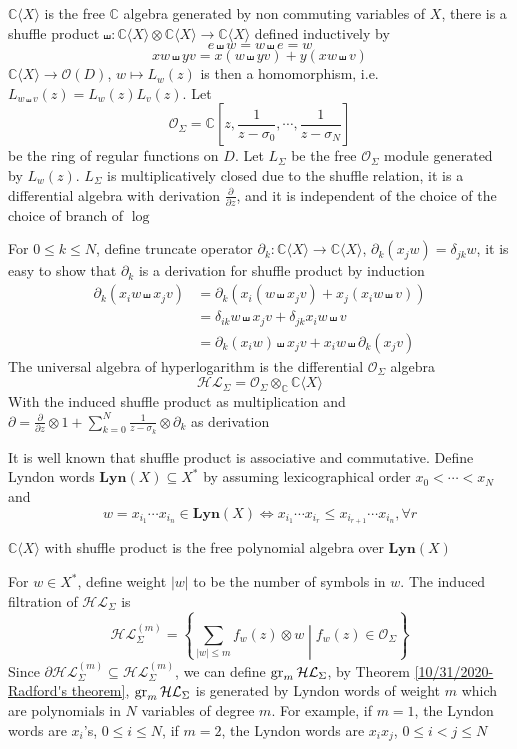 \documentclass[main]{subfiles}
\begin{document}
$\mathbb C\langle X\rangle$ is the free $\mathbb C$ algebra generated by non commuting variables of $X$, there is a shuffle product $\shuffle:\mathbb C\langle X\rangle\otimes\mathbb C\langle X\rangle\to\mathbb C\langle X\rangle$ defined inductively by
\[e\shuffle w=w\shuffle e=w\]
\[xw\shuffle yv=x(w\shuffle yv)+y(xw\shuffle v)\]
$\mathbb C\langle X\rangle\to\mathcal O(D)$, $w\mapsto L_w(z)$ is then a homomorphism, i.e. $L_{w\shuffle v}(z)=L_w(z)L_v(z)$. Let
\[\mathcal O_\Sigma=\mathbb C\left[z,\frac{1}{z-\sigma_0},\cdots,\frac{1}{z-\sigma_N}\right]\]
be the ring of regular functions on $D$. Let $L_\Sigma$ be the free $\mathcal O_\Sigma$ module generated by $L_w(z)$. $L_\Sigma$ is multiplicatively closed due to the shuffle relation, it is a differential algebra with derivation $\frac{\partial}{\partial z}$, and it is independent of the choice of the choice of branch of $\log$

For $0\leq k\leq N$, define truncate operator $\partial_k:\mathbb C\langle X\rangle\to\mathbb C\langle X\rangle$, $\partial_k(x_jw)=\delta_{jk}w$, it is easy to show that $\partial_k$ is a derivation for shuffle product by induction
\begin{align*}
\partial_k(x_iw\shuffle x_jv)&=\partial_k(x_i(w\shuffle x_jv)+x_j(x_iw\shuffle v)) \\
&=\delta_{ik}w\shuffle x_jv+\delta_{jk}x_iw\shuffle v \\
&=\partial_k(x_iw)\shuffle x_jv+x_iw\shuffle\partial_k(x_jv)
\end{align*}
The universal algebra of hyperlogarithm is the differential $\mathcal O_\Sigma$ algebra
\[\mathcal{HL}_\Sigma=\mathcal O_\Sigma\otimes_{\mathbb C}\mathbb C\langle X\rangle\]
With the induced shuffle product as multiplication and $\partial=\frac{\partial}{\partial z}\otimes1+\sum_{k=0}^N\frac{1}{z-\sigma_k}\otimes\partial_k$ as derivation

It is well known that shuffle product is associative and commutative. Define Lyndon words $\mathbf{Lyn}(X)\subseteq X^*$ by assuming lexicographical order $x_0<\cdots<x_N$ and
\[w=x_{i_1}\cdots x_{i_n}\in\mathbf{Lyn}(X)\iff x_{i_1}\cdots x_{i_r}\leq x_{i_{r+1}}\cdots x_{i_n},\forall r\]

\begin{theorem}[Radford]\label{10/31/2020-Radford's theorem}
$\mathbb C\langle X\rangle$ with shuffle product is the free polynomial algebra over $\mathbf{Lyn}(X)$
\end{theorem}

For $w\in X^*$, define weight $|w|$ to be the number of symbols in $w$. The induced filtration of $\mathcal{HL}_\Sigma$ is
\[\mathcal{HL}_\Sigma^{(m)}=\left\{\sum_{|w|\leq m}f_w(z)\otimes w\middle|f_w(z)\in\mathcal O_\Sigma\right\}\]
Since $\partial\mathcal{HL}_\Sigma^{(m)}\subseteq \mathcal{HL}_\Sigma^{(m)}$, we can define $\operatorname{gr}_m\mathcal{HL}_\Sigma$, by Theorem \ref{10/31/2020-Radford's theorem}, $\operatorname{gr}_m\mathcal{HL}_\Sigma$ is generated by Lyndon words of weight $m$ which are polynomials in $N$ variables of degree $m$. For example, if $m=1$, the Lyndon words are $x_i$'s, $0\leq i\leq N$, if $m=2$, the Lyndon words are $x_ix_j$, $0\leq i<j\leq N$
\end{document}
